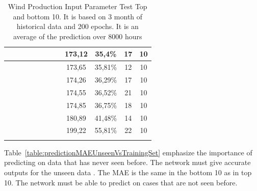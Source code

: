 \begin{center}
\begin{longtable}{|c|c|c|c|c|c|c|c|c|c|c|c|}
 \x &  &  &  &  \x &  \x &  \x &  & 173,12 & 35,4\% & 17 & 10 \\ \hline
 \x &  &  \x &  \x &  &  \x &  \x &  \x & 173,65 & 35,81\% & 12 & 10  \\ \hline
 \x &  \x &  \x &  \x &  \x &  \x &  \x &  \x & 174,26 & 36,29\% & 17 & 10  \\ \hline
 \x &  \x &  &  \x &  &  \x &  \x &  \x & 174,55 & 36,52\% & 21 & 10  \\ \hline
 \x &  &  &  \x &  &  \x &  \x &  \x & 174,85 & 36,75\% & 18 & 10  \\ \hline
 \x &  \x &  \x &  &  \x &  \x &  \x &  & 180,89 & 41,48\% & 14 & 10  \\ \hline
 \x &  \x &  &  &  \x &  \x &  \x &  \x & 199,22 & 55,81\% & 22 & 10 \\ \hline
\caption{Wind Production Input Parameter Test Top and bottom 10. It is based on 3 month of historical data and 200 epochs. It is an average of the prediction over 8000 hours}
\label{table:windProdInputParamsTop10}
\end{longtable}
\end{center}
\normalsize

Table~\ref{table:predictionMAEUnseenVsTrainingSet} emphasize the importance of predicting on data that has never seen before. The network must give accurate outputs for the unseen data \cite{1}. The MAE is the same in the bottom 10 as in top 10. The network must be able to predict on cases that are not seen before.

